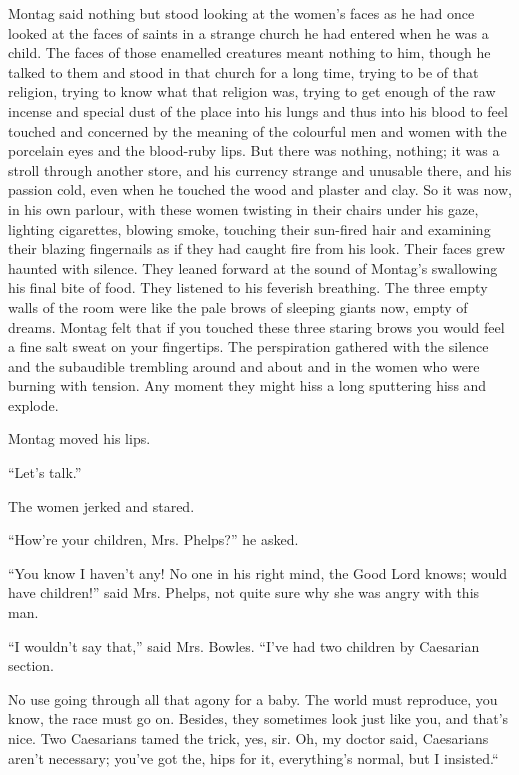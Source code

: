 \documentclass[11pt,openany]{book}
\begin{document}
Montag said nothing but stood looking at the women's faces as he had once looked at the faces of saints in a strange church he had entered when he was a child. The faces of those enamelled creatures meant nothing to him, though he talked to them and stood in that church for a long time, trying to be of that religion, trying to know what that religion was, trying to get enough of the raw incense and special dust of the place into his lungs and thus into his blood to feel touched and concerned by the meaning of the colourful men and women with the porcelain eyes and the blood-ruby lips. But there was nothing, nothing; it was a stroll through another store, and his currency strange and unusable there, and his passion cold, even when he touched the wood and plaster and clay. So it was now, in his own parlour, with these women twisting in their chairs under his gaze, lighting cigarettes, blowing smoke, touching their sun-fired hair and examining their blazing fingernails as if they had caught fire from his look. Their faces grew haunted with silence. They leaned forward at the sound of Montag's swallowing his final bite of food. They listened to his feverish breathing. The three empty walls of the room were like the pale brows of sleeping giants now, empty of dreams. Montag felt that if you touched these three staring brows you would feel a fine salt sweat on your fingertips. The perspiration gathered with the silence and the subaudible trembling around and about and in the women who were burning with tension. Any moment they might hiss a long sputtering hiss and explode.

Montag moved his lips.

``Let's talk.''

The women jerked and stared.

``How're your children, Mrs. Phelps?'' he asked.

``You know I haven't any! No one in his right mind, the Good Lord knows; would have children!'' said Mrs. Phelps, not quite sure why she was angry with this man.

``I wouldn't say that,'' said Mrs. Bowles. ``I've had two children by Caesarian section.

No use going through all that agony for a baby. The world must reproduce, you know, the race must go on. Besides, they sometimes look just like you, and that's nice. Two Caesarians tamed the trick, yes, sir. Oh, my doctor said, Caesarians aren't necessary; you've got the, hips for it, everything's normal, but I insisted.``
\end{document}
